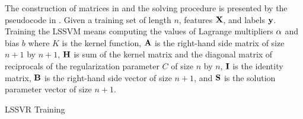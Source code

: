 The construction of matrices in  and the solving procedure is presented by the pseudocode in . Given a training set of length \(n\), features \(\vb{X}\), and labels \(\vb{y}\). Training the LSSVM means computing the values of Lagrange multipliers \(\vb{\alpha}\) and bias \(b\) where \(K\) is the kernel function, \(\vb{A}\) is the right-hand side matrix of size \(n+1\) by \(n+1\), \(\vb{H}\) is sum of the kernel matrix and the diagonal matrix of reciprocals of the regularization parameter \(C\) of size \(n\) by \(n\), \(\vb{I}\) is the identity matrix, \(\vb{B}\) is the right-hand side vector of size \(n+1\), and \(\vb{S}\) is the solution parameter vector of size \(n+1\).
\begin{algorithm}[H]
  \caption{LSSVR Training}\label{alg:lssvr_training}
  \begin{algorithmic}[1]
    \State{\(\Omega \gets [[]]\)}

    \EndFor{}
    \EndFor{}
    \EndFor{}
    \EndFor{}
    \EndFor{}
    \EndFor{}
    \EndFor{}
    \EndProcedure{}
  \end{algorithmic}
\end{algorithm}

